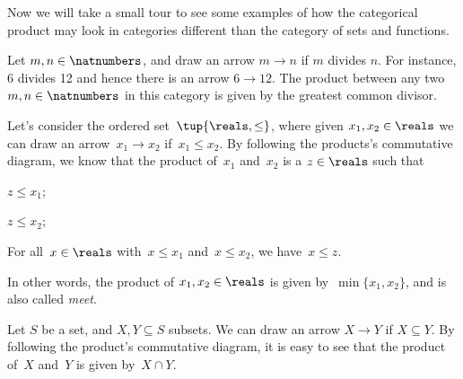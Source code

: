 Now we will take a small tour to see some examples of how the categorical product may look in categories different than the category \Set of sets and functions.

\begin{example}
Let $m,n\in \natnumbers$, and draw an arrow $m\to n$ if $m$ divides $n$. For instance, 6 divides 12 and hence there is an arrow $6\to 12$. The product between any two $m,n\in \natnumbers$ in this category is given by the greatest common divisor.
\end{example}

\begin{example}
Let's consider the ordered set~$\tup{\reals,\leq}$, where given $x_1,x_2\in \reals$ we can draw an arrow~$x_1\to x_2$ if~$x_1\leq x_2$. By following the products's commutative diagram, we know that the product of~$x_1$ and~$x_2$ is a $z\in \reals$ such that
\begin{compactitem}
\item $z\leq x_1$;
\item $z\leq x_2$;
\item For all~$x\in \reals$ with~$x\leq x_1$ and~$x\leq x_2$, we have~$x\leq z$.
\end{compactitem}
In other words, the product of $x_1,x_2\in \reals$ is given by~$\min\{x_1,x_2\}$, and is also called \emph{meet}.
\end{example}

\begin{example}
\label{ex:subset_prod}
Let $S$ be a set, and $X,Y\subseteq S$ subsets. We can draw an arrow $X\to Y$ if $X\subseteq Y$. By following the product's commutative diagram, it is easy to see that the product of~$X$ and~$Y$ is given by~$X\cap Y$.
\end{example}



